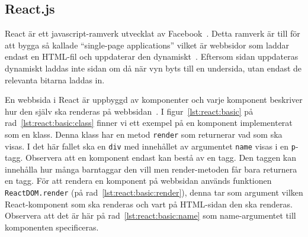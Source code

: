 \documentclass[a4paper,12pt]{article}
\newcommand{\li}{\lstinline}
\begin{document}
\FloatBarrier




\subsection{React.js}
\label{subsec:react}
\FloatBarrier
React är ett javascript-ramverk utvecklat av Facebook~\cite{web:react}. Detta ramverk är till för att bygga så kallade ``single-page applications'' vilket är webbsidor som laddar endast en HTML-fil och uppdaterar den dynamiskt~\cite{web:wikipedia:spa}. Eftersom sidan uppdateras dynamiskt laddas inte sidan om då när vyn byts till en undersida, utan endast de relevanta bitarna laddas in.

En webbsida i React är uppbyggd av komponenter och varje komponent beskriver hur den själv ska renderas på webbsidan~\cite{web:react}. I figur~\ref{lst:react:basic} på rad~\ref{lst:react:basic:class} finner vi ett exempel på en komponent implementerat som en klass. Denna klass har en metod \li{render} som returnerar vad som ska visas. I det här fallet ska en \li{div} med innehållet av argumentet \li{name} visas i en \li{p}-tagg. Observera att en komponent endast kan bestå av en tagg. Den taggen kan innehålla hur många barntaggar den vill men render-metoden får bara returnera en tagg. För att rendera en komponent på webbsidan används funktionen \li{ReactDOM.render} (på rad~\ref{lst:react:basic:render}), denna tar som argument vilken React-komponent som ska renderas och vart på HTML-sidan den ska renderas. Observera att det är här på rad~\ref{lst:react:basic:name} som name-argumentet till komponenten specificeras.
\end{document}
